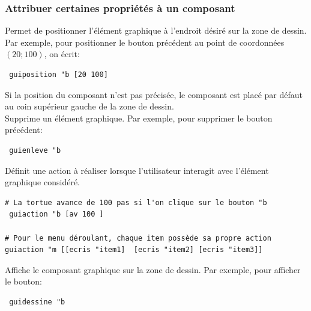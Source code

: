 \subsubsection{Attribuer certaines propriétés à un composant}
\noindent {}
Permet de positionner l'élément graphique à l'endroit désiré sur la zone de dessin. Par exemple, pour positionner le bouton précédent au point de coordonnées $(20;100)$, on écrit:\\
\begin{verbatim}
 guiposition "b [20 100]
\end{verbatim}
 Si la position du composant n'est pas précisée, le composant est placé par défaut au coin supérieur gauche de la zone de dessin.\\
Supprime un élément graphique. Par exemple, pour supprimer le bouton précédent:
\begin{verbatim}
 guienleve "b
\end{verbatim}
\noindent 
{}
Définit une action à réaliser lorsque l'utilisateur interagit avec l'élément graphique considéré.
\begin{verbatim}
# La tortue avance de 100 pas si l'on clique sur le bouton "b
 guiaction "b [av 100 ]

# Pour le menu déroulant, chaque item possède sa propre action
guiaction "m [[ecris "item1]  [ecris "item2] [ecris "item3]]
\end{verbatim}
\noindent {}
Affiche le composant graphique sur la zone de dessin. Par exemple, pour afficher le bouton:
\begin{verbatim}
 guidessine "b
\end{verbatim}
